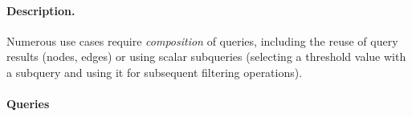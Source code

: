 
\paragraph{Description.}

Numerous use cases require \emph{composition} of queries, including the reuse of
query results (\eg nodes, edges) or using scalar subqueries (\eg selecting a
threshold value with a subquery and using it for subsequent filtering
operations).


\paragraph{Queries}
{\raggedright

}